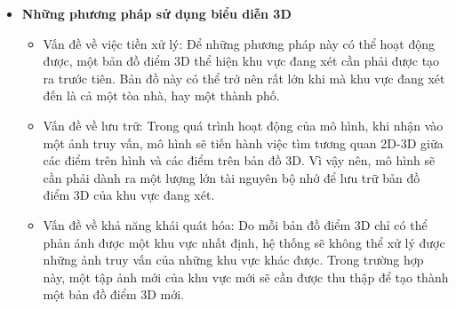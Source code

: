 \begin{itemize}
    \item \textbf{Những phương pháp sử dụng biểu diễn 3D}
    \begin{itemize}
        \item Vấn đề về việc tiền xử lý: Để những phương pháp này có thể hoạt động được, một bản đồ điểm 3D thể hiện khu vực đang xét cần phải được tạo ra trước tiên. Bản đồ này có thể trở nên rất lớn khi mà khu vực đang xét đến là cả một tòa nhà, hay một thành phố.
        \item Vấn đề về lưu trữ: Trong quá trình hoạt động của mô hình, khi nhận vào một ảnh truy vấn, mô hình sẽ tiến hành việc tìm tương quan 2D-3D giữa các điểm trên hình và các điểm trên bản đồ 3D. Vì vậy nên, mô hình sẽ cần phải dành ra một lượng lớn tài nguyên bộ nhớ để lưu trữ bản đồ điểm 3D của khu vực đang xét.
        \item Vấn đề về khả năng khái quát hóa: Do mỗi bản đồ điểm 3D chỉ có thể phản ánh được một khu vực nhất định, hệ thống sẽ không thể xử lý được những ảnh truy vấn của những khu vực khác được. Trong trường hợp này, một tập ảnh mới của khu vực mới sẽ cần được thu thập để tạo thành một bản đồ điểm 3D mới.
    \end{itemize}


\end{itemize}
